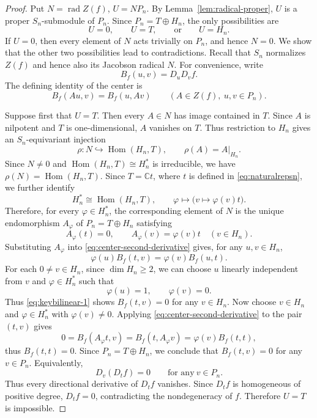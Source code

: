 \documentclass[11pt,reqno]{amsart}
\numberwithin{equation}{section}
\theoremstyle{definition}
\theoremstyle{remark}
\newcommand{\C}{\mathbb C}
\newcommand{\Hom}{\operatorname{Hom}}
\newcommand{\rad}{\operatorname{rad}}
\begin{document}
\begin{proof}
Put $N=\rad Z(f)$, $U=NP_n$. By Lemma~\ref{lem:radical-proper}, $U$ is a proper
$S_n$-submodule of $P_n$.  Since $P_n=T\oplus H_n$,  the only possibilities are
\[
  U=0,\qquad U=T,\qquad\text{or}\qquad U=H_n.
\]
If $U=0$, then every element of $N$ acts trivially on $P_n$, and
hence $N=0$.  We show that the other two possibilities lead to
contradictions. Recall that $S_n$ normalizes $Z(f)$ and hence also its Jacobson
radical $N$.  For convenience, write
\[
  B_f(u,v)=D_uD_vf.
\]
The defining identity of the center is
\begin{equation}\label{eq:center-second-derivative}
  B_f(Au,v)=B_f(u,Av)
  \qquad(A\in Z(f),\ u,v\in P_n).
\end{equation}

Suppose first that $U=T$.  Then every $A\in N$ has image contained
in $T$.  Since $A$ is nilpotent and $T$ is one-dimensional, $A$
vanishes on $T$.   Thus restriction to $H_n$ gives an $S_n$-equivariant injection
\[
  \rho:N\hookrightarrow\Hom(H_n,T),
  \qquad
  \rho(A)=A|_{H_n}.
\]
Since $N\ne0$ and $\Hom(H_n,T)\cong H_n^*$ is irreducible, we have $\rho(N)=\Hom(H_n,T)$.  Since $T=\C t$, where $t$ is defined in \eqref{eq:naturalrepsn},  we further identify
\[
  H_n^*\cong\Hom(H_n,T),
  \qquad
  \varphi\longmapsto
  \bigl(v\mapsto\varphi(v)t\bigr).
\]
Therefore, for every $\varphi\in H_n^*$, the corresponding element
of $N$ is the unique endomorphism $A_\varphi$ of
$P_n=T\oplus H_n$ satisfying
\[
  A_\varphi(t)=0,
  \qquad
  A_\varphi(v)=\varphi(v)t
  \quad(v\in H_n).
\]
Substituting $A_\varphi$ into \eqref{eq:center-second-derivative} gives, for any $u,v\in H_n$, 
\begin{equation}\label{eq:keybilinear-1}
  \varphi(u)B_f(t,v)
  =
  \varphi(v)B_f(u,t).
\end{equation}
For each $0\ne v\in H_n$, since $\dim H_n\geq 2$, we can choose $u$ linearly independent from $v$ and
$\varphi\in H_n^*$ such that
\[
  \varphi(u)=1,
  \qquad
  \varphi(v)=0.
\]
Thus \eqref{eq:keybilinear-1} shows $B_f(t,v)=0$ for any $v\in H_n$. Now choose $v\in H_n$ and $\varphi\in H_n^*$ with
$\varphi(v)\ne0$.  Applying
\eqref{eq:center-second-derivative} to the pair $(t,v)$ gives
\[
  0
  =
  B_f(A_\varphi t,v)
  =
  B_f(t,A_\varphi v)
  =
  \varphi(v)B_f(t,t),
\]
thus $B_f(t,t)=0$. Since $P_n=T\oplus H_n$, we conclude that  $B_f(t,v)=0$ for any $v\in P_n$. Equivalently,
\[
  D_v(D_tf)=0
  \qquad \text{for any}\ v\in P_n.
\]
Thus every directional derivative of $D_tf$ vanishes.  Since
$D_tf$ is homogeneous of positive degree, $D_tf=0$, contradicting
the nondegeneracy of $f$.  Therefore $U=T$ is impossible.


\end{proof}
\end{document}
